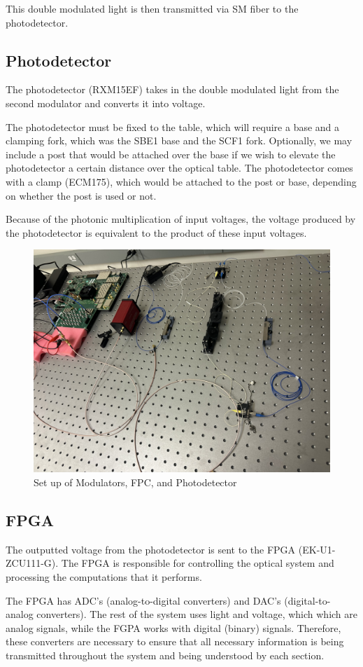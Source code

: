 \documentclass[11pt]{article}
\begin{document}
  This double modulated light is then transmitted via SM fiber to the photodetector.

\subsection{Photodetector}

The photodetector (RXM15EF) takes in the double modulated light from the second modulator and converts it into voltage.

The photodetector must be fixed to the table, which will require a base and a clamping fork, which was the SBE1 base and the SCF1 fork. Optionally, we may include a post that would be attached over the base if we wish to elevate the photodetector a certain distance over the optical table. The photodetector comes with a clamp (ECM175), which would be attached to the post or base, depending on whether the post is used or not.

Because of the photonic multiplication of input voltages, the voltage produced by the photodetector is equivalent to the product of these input voltages.

\begin{figure}[H]
    \centering
    \includegraphics[width=0.5\linewidth]{modsandpd.jpg}
    \caption{Set up of Modulators, FPC, and Photodetector}
    \label{fig:enter-label}
\end{figure}

\subsection{FPGA}

The outputted voltage from the photodetector is sent to the FPGA (EK-U1-ZCU111-G). The FPGA is responsible for controlling the optical system and processing the computations that it performs. 

The FPGA has ADC's (analog-to-digital converters) and DAC's (digital-to-analog converters). The rest of the system uses light and voltage, which which are analog signals, while the FGPA works with digital (binary) signals. Therefore, these converters are necessary to ensure that all necessary information is being transmitted throughout the system and being understood by each section.
\end{document}
